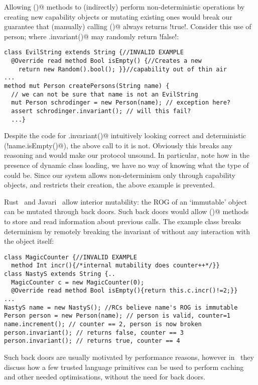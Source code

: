  Allowing \Q@invariant()@ methods to (indirectly) perform non-deterministic operations by creating new capability objects or mutating existing ones would break our guarantee that (manually) calling \Q@invariant()@ always returns \Q!true!.
Consider this use of person; where \Q@myPerson.invariant()@ may randomly return \Q!false!:
\begin{lstlisting}[morekeywords={assert}]
class EvilString extends String {//INVALID EXAMPLE
  @Override read method Bool isEmpty() {//Creates a new
    return new Random().bool(); }}//capability out of thin air
...
method mut Person createPersons(String name) {
  // we can not be sure that name is not an EvilString
  mut Person schrodinger = new Person(name); // exception here?
  assert schrodinger.invariant(); // will this fail?
  ...}
\end{lstlisting}
Despite the code for \Q@Person.invariant()@ intuitively looking correct and deterministic (\Q@!name.isEmpty()@), the above call to it is not. Obviously this breaks any reasoning and would make our protocol unsound. 
In particular, note how in the presence of dynamic class loading, we have no way of knowing what the type of \Q@name@ could be. Since our system allows non-determinism only through capability objects, and 
restricts their creation, the above example is prevented.

Rust~\cite{matsakis2014rust} and Javari~\cite{TschantzErnst05}
allow interior mutability:
the ROG of an `immutable' object can be mutated through back doors.
Such back doors would allow \Q@invariant()@ methods to store and read information about previous calls.
The example class \Q@MagicCounter@ breaks determinism by
remotely breaking the invariant of \Q@person@ without any interaction with the \Q@person@ object itself:
\begin{lstlisting}
class MagicCounter {//INVALID EXAMPLE
  method Int incr(){/*internal mutability does counter++*/}}
class NastyS extends String {..
  MagicCounter c = new MagicCounter(0);
  @Override read method Bool isEmpty(){return this.c.incr()!=2;}}
...
NastyS name = new NastyS(); //RCs believe name's ROG is immutable
Person person = new Person(name); // person is valid, counter=1
name.increment(); // counter == 2, person is now broken
person.invariant(); // returns false, counter == 3
person.invariant(); // returns true, counter == 4
\end{lstlisting}
Such back doors are usually motivated by performance reasons, however in~\cite{GordonEtAl12} they
discuss how a few trusted language primitives can be used to perform caching and other needed optimisations,
without the need for back doors.


